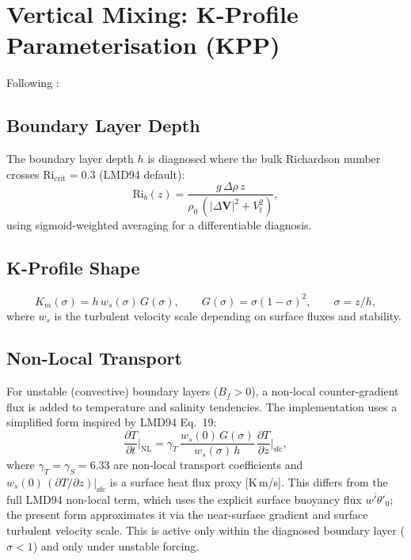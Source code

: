 \documentclass[11pt,twoside]{report}
\newcommand{\pp}{\partial}
\newcommand{\vect}[1]{\bm{#1}}
\begin{document}
\section{Vertical Mixing: K-Profile Parameterisation (KPP)}
\label{sec:kpp}

Following \citet{LMD1994}:

\subsection{Boundary Layer Depth}

The boundary layer depth $h$ is diagnosed where the bulk Richardson number
crosses $\mathrm{Ri}_{\mathrm{crit}}=0.3$ (LMD94 default):
\begin{equation}
  \mathrm{Ri}_b(z) = \frac{g\,\Delta\rho\,z}
  {\rho_0\,(|\Delta\vect{V}|^2+V_t^2)},
\end{equation}
using sigmoid-weighted averaging for a differentiable diagnosis.

\subsection{K-Profile Shape}
\begin{equation}
  K_m(\sigma) = h\,w_s(\sigma)\,G(\sigma),
  \qquad G(\sigma) = \sigma(1-\sigma)^2,
  \qquad \sigma=z/h,
\end{equation}
where $w_s$ is the turbulent velocity scale depending on surface fluxes
and stability.

\subsection{Non-Local Transport}

For unstable (convective) boundary layers ($B_f>0$), a non-local
counter-gradient flux is added to temperature and salinity tendencies.
The implementation uses a simplified form inspired by LMD94 Eq.~19:
\begin{equation}
  \frac{\pp T}{\pp t}\bigg|_{\mathrm{NL}} =
  \gamma_T\,\frac{w_s(0)\,G(\sigma)}{w_s(\sigma)\,h}\,
  \frac{\pp T}{\pp z}\bigg|_{\mathrm{sfc}},
\end{equation}
where $\gamma_T=\gamma_S=6.33$ are non-local transport coefficients
and $w_s(0)\,(\pp T/\pp z)|_{\mathrm{sfc}}$ is a surface heat flux
proxy [K\,m/s].  This differs from the full LMD94 non-local term, which
uses the explicit surface buoyancy flux $\overline{w'\theta'}_0$;
the present form approximates it via the near-surface gradient
and surface turbulent velocity scale.
This is active only within the diagnosed boundary layer ($\sigma<1$)
and only under unstable forcing.
\end{document}
